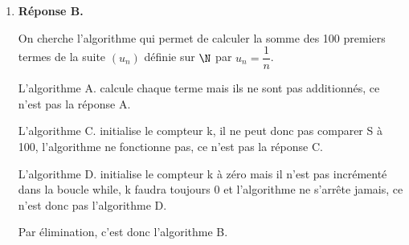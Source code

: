 \begin{enumerate}
Les évènements $A$ et $B$ partitionnant l'univers,  la loi des probabilités totales donne :

$P(V)=P(V\cap A )+p(V \cap B) =P(A) \times P_A(V) +\dfrac{3}{8}=\dfrac{1}{2}\times \dfrac{1}{2}+\dfrac{3}{8}=\dfrac{1}{4}+\dfrac{3}{8}= \dfrac{2}{8}+\dfrac{3}{8}=\dfrac{5}{8}$

$P_V(B)=\dfrac{P(V\cap B)}{P(V)}= \dfrac{\frac{3}{8}}{\frac{5}{8}}= \dfrac{3}{5}$.
\item \textbf{Réponse B.}








On cherche l'algorithme qui permet de calculer la somme des 100 premiers termes de la suite $\left( u_n\right)$ définie sur $\N$ par $u_n=\dfrac{1}{n}$.
	
	L'algorithme A.  calcule chaque terme mais ils ne sont pas additionnés,  ce n'est pas la réponse A. 
	
	L'algorithme C.  initialise le compteur k,  il ne peut donc pas comparer S à 100,  l'algorithme ne fonctionne pas,  ce n'est pas la réponse C.

	L'algorithme D. initialise le compteur k à zéro mais il n'est pas incrémenté dans la boucle while,  k faudra toujours 0 et l'algorithme ne s'arrête jamais, ce n'est donc pas l'algorithme D. 

	Par élimination,  c'est donc l'algorithme B. 

\end{enumerate}
\bigskip
